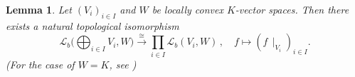 \documentclass[a4paper, reqno, 10pt]{amsart}
\newtheorem{lemma}[theorem]{Lemma}
\theoremstyle{definition}
\numberwithin{equation}{section}
\newcommand{\blank}{{\,\_\,}}
\newcommand{\lra}{\longrightarrow}
\newcommand{\lto}{\longmapsto}
\newcommand{\res}[1]{{\!\,\mid_{#1}}}
\newcommand{\CL}{{\mathcal {L}}}
\begin{document}
\begin{lemma}\label{Lemma A1 - Isomorphism for space of linear maps on direct sum with strong topology}
Let $(V_i)_{i\in I}$ and $W$ be locally convex $K$-vector spaces.
Then there exists a natural topological isomorphism
\begin{equation*}
	\CL_b \bigg(\bigoplus_{i\in I} V_i, W \bigg) \overset{\cong}{\lra} \prod_{i\in I}\CL_b (V_i,W) \,,\quad f \lto (f\res{V_i})_{i\in I} .
\end{equation*}
(For the case of $W=K$, see \cite[Prop.\ 9.10]{Schneider02NonArchFunctAna})
\end{lemma}
\end{document}
